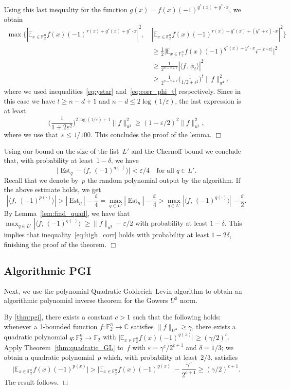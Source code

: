 \documentclass[11pt]{amsart}
\newcommand{\E}{\mathbb{E}}
\newcommand{\C}{\mathbb{C}} %
\newcommand{\F}{\mathbb{F}} %
\newcommand{\eps}{\varepsilon}
\DeclareMathOperator{\Est}{Est}
\theoremstyle{plain}
\theoremstyle{definition}
\theoremstyle{remark}
\renewenvironment{proof}[1][]{
    	\begin{trivlist}
     	\item[\hspace{\labelsep}{\em\noindent Proof#1:\/}]}
     	{{\hfill$\Box$}
    	\end{trivlist}
  }
\begin{document}
\begin{proof}[ of \cref{thm:quadratic_GL}]
\begin{proof}
Using this last inequality for the function $g(x) = f(x) (-1)^{q^*(x) + y^*\cdot x}$, we obtain
\begin{align*}
    \max\big\{|\E_{x\in \F_2^n} f(x) (-1)^{r(x) + q^*(x) + y^* \cdot x}|^2,\: &|\E_{x\in \F_2^n} f(x) (-1)^{r(x)+q^*(x) + (y^*+c) \cdot x}|^2 \big\} \\
    &\geq \frac{1}{2} \big|\E_{x\in \F_2^n} f(x) (-1)^{q^*(x) + y^* \cdot x} i^{-|c\circ x|}\big|^2 \\
    &\geq \frac{1}{2^{n-d+1}} |\langle f,\, \phi_t \rangle|^2 \\
    &\geq \frac{1}{2^{n-d+1}} \Big(\frac{1}{1/2+\eps^2}\Big)^t \|f\|_{u^3}^2,
\end{align*}
where we used inequalities~\eqref{eq:ystar} and~\eqref{eq:corr_phi_t} respectively.
Since in this case we have $t\geq n-d+1$ and $n-d\leq 2\log(1/\eps)$, the last expression is at least
$$\Big(\frac{1}{1 + 2\eps^2}\Big)^{2\log(1/\eps)+1} \|f\|_{u^3}^2 \geq (1-\eps/2)^2 \|f\|_{u^3}^2,$$
where we use that~$\eps \leq 1/100$. 
This concludes the proof of the lemma.
\end{proof}

Using our bound on the size of the list~$L'$ and the Chernoff bound we conclude that, with probability at least~$1-\delta$, we have
$$\big|\Est_q - \langle f,\, (-1)^{q(\cdot)}\rangle\big| < \eps/4 \quad \text{for all $q\in L'$.}$$
Recall that we denote by~$p$ the random polynomial output by the algorithm.
If the above estimate holds, we get
$$|\langle f,\, (-1)^{p(\cdot)}\rangle| > |\Est_p| - \frac{\eps}{4} = \max_{q \in L'} |\Est_q| - \frac{\eps}{4} > \max_{q \in L'} |\langle f,\, (-1)^{q(\cdot)}\rangle| - \frac{\eps}{2}.$$
By Lemma~\ref{lem:find_quad}, we have that $\max_{q \in L'} |\langle f,\, (-1)^{q(\cdot)}\rangle| \geq \|f\|_{u^3} - \eps/2$ with probability at least $1-\delta$.
This implies that inequality~\eqref{eq:high_corr} holds with probability at least $1-2\delta$, finishing the proof of the theorem.
\end{proof}


\subsection{Algorithmic PGI}
Next, we use the polynomial Quadratic Goldreich--Levin algorithm to obtain an algorithmic polynomial inverse theorem for the Gowers $U^3$ norm.

\begin{proof}[ of \cref{thm:algoPGI}]
By \cref{thm:pgi}, there exists a constant $c>1$ such that the following holds:
whenever a 1-bounded function $f: \F_2^n \to \C$ satisfies $\|f\|_{U^3} \geq \gamma$, there exists a quadratic polynomial $q: \F_2^n \to \F_2$ with
$\big|\E_{x\in \F_2^n} f(x) (-1)^{q(x)}\big| \geq (\gamma/2)^c$.
Apply Theorem~\ref{thm:quadratic_GL} to~$f$ with $\eps = \gamma^c/2^{c+1}$ and $\delta = 1/3$;
we obtain a quadratic polynomial~$p$ which, with probability at least~$2/3$, satisfies
$$\big|\E_{x\in \F_2^n} f(x) (-1)^{p(x)}\big| > \big|\E_{x\in \F_2^n} f(x) (-1)^{q(x)}\big| - \frac{\gamma^c}{2^{c+1}} \geq (\gamma/2)^{c+1}.$$
The result follows.
\end{proof}
\end{document}
